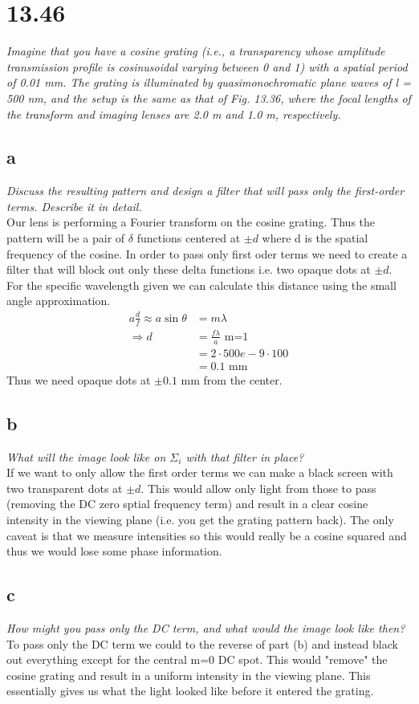 \documentclass[a4paper, 11pt]{article}
\begin{document}
\section*{13.46} 
\textit{Imagine that you have a cosine grating (i.e., a transparency
	whose amplitude transmission profile is cosinusoidal varying between
	0 and 1) with a spatial period of 0.01 mm. The grating is illuminated
	by quasimonochromatic plane waves of l = 500 nm, and the setup is
	the same as that of Fig. 13.36, where the focal lengths of the transform
	and imaging lenses are 2.0 m and 1.0 m, respectively.}
\subsection*{a}
\textit{Discuss the resulting pattern and design a filter that will pass only
	the first-order terms. Describe it in detail.}\\
	
	Our lens is performing a Fourier transform on the cosine grating. Thus the pattern will be a pair of $\delta$ functions centered at $\pm d$ where d is the spatial frequency of the cosine. In order to pass only first oder terms we need to create a filter that will block out only these delta functions i.e. two opaque dots at $\pm d$. For the specific wavelength given we can calculate this distance using the small angle approximation. 
		\begin{align*}
			a\frac{d}{f} \approx a\sin\theta &= m\lambda \\ 
			\Rightarrow d &= \frac{f\lambda}{a}\text{ m=1} \\ 
				&= 2\cdot 500e-9\cdot 100 \\
				&= 0.1 \text{ mm} 
		\end{align*} 
	Thus we need opaque dots at $\pm 0.1$ mm from the center. 
\subsection*{b}
\textit{What will the image look like on $\Sigma_i$ with that filter in place?}\\
	If we want to only allow the first order terms we can make a black screen with two transparent dots at $\pm d$. This would allow only light from those to pass (removing the DC zero sptial frequency term) and result in a clear cosine intensity in the viewing plane (i.e. you get the grating pattern back). The only caveat is that we measure intensities so this would really be a cosine squared and thus we would lose some phase information. 

\subsection*{c}
\textit{How might you pass only the DC term, and what would the image
	look like then?}\\
	
	To pass only the DC term we could to the reverse of part (b) and instead black out everything except for the central m=0 DC spot. This would "remove" the cosine grating and result in a uniform intensity in the viewing plane. This essentially gives us what the light looked like before it entered the grating. 
\end{document}
